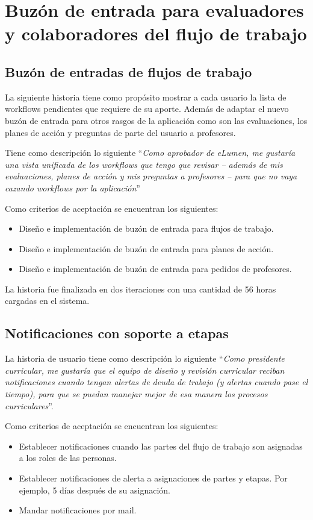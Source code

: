 \section{Buzón de entrada para evaluadores y colaboradores del flujo de trabajo}
\subsection{Buzón de entradas de flujos de trabajo}
La siguiente historia tiene como propósito mostrar a cada usuario la lista de workflows pendientes que requiere de su aporte. Además de adaptar el nuevo buzón de entrada para otros rasgos de la aplicación como son las evaluaciones, los planes de acción y preguntas de parte del usuario a profesores.

Tiene como descripción lo siguiente \enquote{\textit{Como aprobador de eLumen, me gustaría una vista unificada de los workflows que tengo que revisar – además de mis evaluaciones, planes de acción y mis preguntas a profesores – para que no vaya cazando workflows por la aplicación}}

Como criterios de aceptación se encuentran los siguientes:
\begin{itemize}
	\item Diseño e implementación de buzón de entrada para flujos de trabajo.
	\item Diseño e implementación de buzón de entrada para planes de acción.
	\item Diseño e implementación de buzón de entrada para pedidos de profesores.
\end{itemize}

La historia fue finalizada en dos iteraciones con una cantidad de 56 horas cargadas en el sistema.

\subsection{Notificaciones con soporte a etapas}
La historia de usuario tiene como descripción lo siguiente \enquote{\textit{Como presidente curricular, me gustaría que el equipo de diseño y revisión curricular reciban notificaciones cuando tengan alertas de deuda de trabajo (y alertas cuando pase el tiempo), para que se puedan manejar mejor de esa manera los procesos curriculares}}.

Como criterios de aceptación se encuentran los siguientes:
\begin{itemize}
	\item Establecer notificaciones cuando las partes del flujo de trabajo son asignadas a los roles de las personas.
	\item Establecer notificaciones de alerta a asignaciones de partes y etapas. Por ejemplo, 5 días después de su asignación.
	\item Mandar notificaciones por mail.
\end{itemize}

